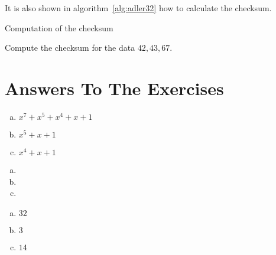 It is also shown in algorithm~\ref{alg:adler32} how to calculate the
\adlerchk checksum.

\begin{algorithm}[H]
  \caption{Computation of the \adlerchk checksum}\algohack{}
  \label{alg:adler32}
  \begin{algorithmic}[1]

    \EndForEach
    \State {}
    \EndProcedure
  \end{algorithmic}
\end{algorithm}

\begin{Exercise}[label={ex-adler32}]

  Compute the \adlerchk checksum for the data $42,43,67$.

\end{Exercise}

\section{Answers To The Exercises}

\begin{Answer}[ref={bin-to-poly}]
  \begin{enumerate}[(a)]
  \item $x^7 + x^5 + x^4 + x + 1$
  \item $x^5+ x + 1$
  \item $x^4 + x + 1$
  \end{enumerate}
\end{Answer}

\begin{Answer}[ref={poly-to-bin}]
  \begin{enumerate}[(a)]
  \item {}
  \item {}
  \item {}
  \end{enumerate}
\end{Answer}

\begin{Answer}[ref={width-poly}]

  \begin{enumerate}[(a)]
  \item $32$
  \item $3$
  \item $14$
  \end{enumerate}

\end{Answer}

